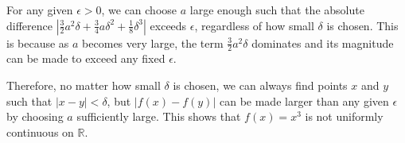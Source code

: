 \documentclass[12]{amsart}
\theoremstyle{definition}
\newcommand{\R}{\mathbb{R}}
\begin{document}
For any given $\epsilon > 0$, we can choose $a$ large enough such that the absolute
difference $\left|\frac{3}{2} a^2 \delta + \frac{3}{4} a \delta^2 + \frac{1}{8} \delta^3\right|$
exceeds $\epsilon$, regardless of how small $\delta$ is chosen. This is because
as $a$ becomes very large, the term $\frac{3}{2} a^2 \delta$ dominates
and its magnitude can be made to exceed any fixed $\epsilon$.

Therefore, no matter how small $\delta$ is chosen, we can always find
points $x$ and $y$ such that $|x - y| < \delta$, but $|f(x) - f(y)|$
can be made larger than any given $\epsilon$ by choosing $a$ sufficiently large.
This shows that $f(x) = x^3$ is not uniformly continuous on $\R$.
\end{document}
